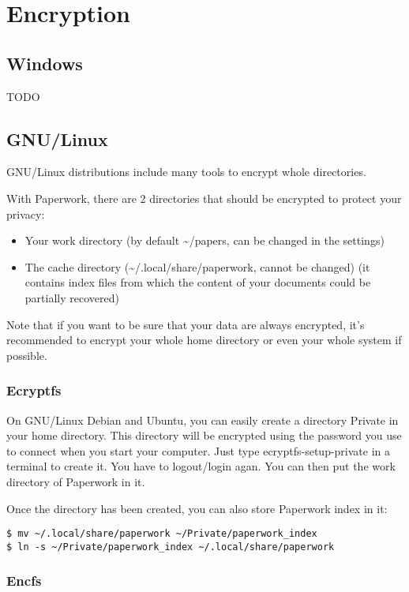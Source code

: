 \documentclass[10pt,a4paper]{article}
\begin{document}
\section{Encryption}

\subsection{Windows}

TODO


\subsection{GNU/Linux}

GNU/Linux distributions include many tools to encrypt whole directories.

With Paperwork, there are 2 directories that should be encrypted to
protect your privacy:
\begin{itemize}
\item Your work directory (by default \textasciitilde /papers, can be changed
in the settings)
\item The cache directory (\textasciitilde /.local/share/paperwork, cannot
be changed) (it contains index files from which the content of your
documents could be partially recovered)
\end{itemize}

Note that if you want to be sure that your data are always encrypted,
it's recommended to encrypt your whole home directory or even your whole system
if possible.

\subsubsection{Ecryptfs}

On GNU/Linux Debian and Ubuntu, you can easily create a directory
Private in your home directory. This directory will be encrypted using
the password you use to connect when you start your computer. Just
type ecryptfs-setup-private in a terminal to create it. You have to
logout/login agan. You can then put the work directory of Paperwork
in it.

Once the directory has been created, you can also store Paperwork
index in it:
\begin{verbatim}
$ mv ~/.local/share/paperwork ~/Private/paperwork_index
$ ln -s ~/Private/paperwork_index ~/.local/share/paperwork
\end{verbatim}

\subsubsection{Encfs}
\end{document}
